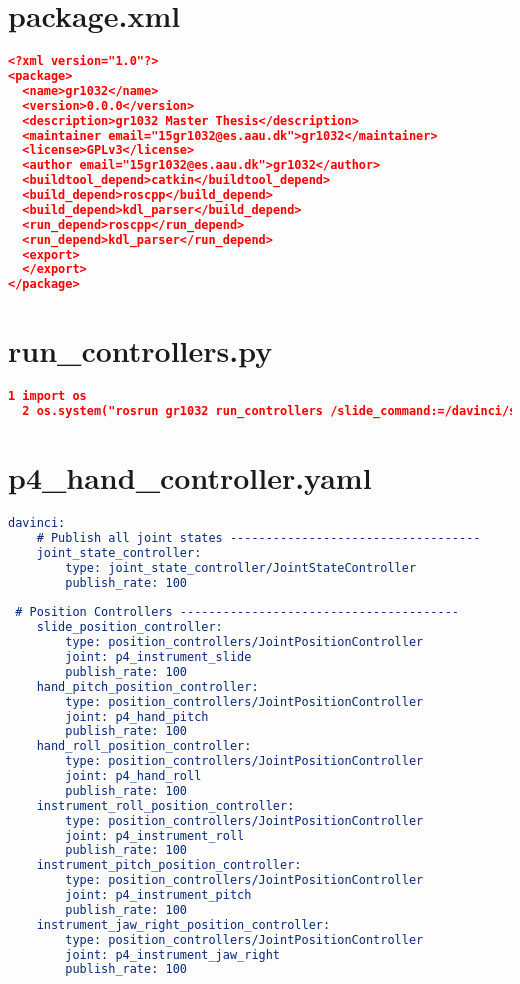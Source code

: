 \section*{package.xml}
\begin{lstlisting}[language=cmake]
<?xml version="1.0"?>
<package>
  <name>gr1032</name>
  <version>0.0.0</version>
  <description>gr1032 Master Thesis</description>
  <maintainer email="15gr1032@es.aau.dk">gr1032</maintainer>
  <license>GPLv3</license>
  <author email="15gr1032@es.aau.dk">gr1032</author>
  <buildtool_depend>catkin</buildtool_depend>
  <build_depend>roscpp</build_depend>
  <build_depend>kdl_parser</build_depend>
  <run_depend>roscpp</run_depend>
  <run_depend>kdl_parser</run_depend>
  <export>
  </export>
</package>
\end{lstlisting}
\section*{run\_controllers.py}
\begin{lstlisting}[language=cmake]
  1 import os
  2 os.system("rosrun gr1032 run_controllers /slide_command:=/davinci/slide_position_controller/c    ommand /pitch_command:=/davinci/hand_pitch_position_controller/command /roll_command:=/davinc    i/hand_roll_position_controller/command /inst_roll_command:=/davinci/instrument_roll_position    _controller/command /inst_pitch_command:=/davinci/instrument_pitch_position_controller/comman    d /inst_jaw_right_command:=/davinci/instrument_jaw_right_position_controller/command")
\end{lstlisting}
\section*{p4\_hand\_controller.yaml}
\begin{lstlisting}[language=cmake]
davinci:
    # Publish all joint states -----------------------------------
    joint_state_controller:
        type: joint_state_controller/JointStateController
        publish_rate: 100
        
 # Position Controllers ---------------------------------------
    slide_position_controller:
        type: position_controllers/JointPositionController
        joint: p4_instrument_slide
        publish_rate: 100
    hand_pitch_position_controller:
        type: position_controllers/JointPositionController
        joint: p4_hand_pitch
        publish_rate: 100
    hand_roll_position_controller:
        type: position_controllers/JointPositionController
        joint: p4_hand_roll
        publish_rate: 100
    instrument_roll_position_controller:
        type: position_controllers/JointPositionController
        joint: p4_instrument_roll
        publish_rate: 100
    instrument_pitch_position_controller:
        type: position_controllers/JointPositionController
        joint: p4_instrument_pitch
        publish_rate: 100
    instrument_jaw_right_position_controller:
        type: position_controllers/JointPositionController
        joint: p4_instrument_jaw_right
        publish_rate: 100
\end{lstlisting}

